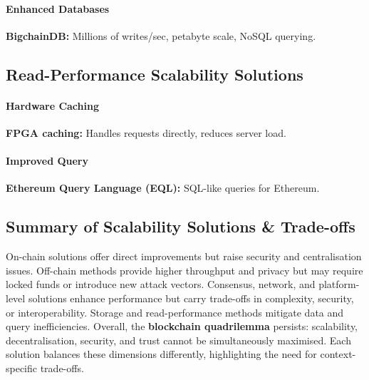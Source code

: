 \paragraph{Enhanced Databases}
\textbf{BigchainDB:} Millions of writes/sec, petabyte scale, NoSQL querying.

\subsection{Read-Performance Scalability Solutions}
\paragraph{Hardware Caching}
\textbf{FPGA caching:} Handles requests directly, reduces server load.

\paragraph{Improved Query}
\textbf{Ethereum Query Language (EQL):} SQL-like queries for Ethereum.

\subsection{Summary of Scalability Solutions \& Trade-offs}
On-chain solutions offer direct improvements but raise security and centralisation issues. Off-chain methods provide higher throughput and privacy but may require locked funds or introduce new attack vectors. Consensus, network, and platform-level solutions enhance performance but carry trade-offs in complexity, security, or interoperability. Storage and read-performance methods mitigate data and query inefficiencies.  
Overall, the \textbf{blockchain quadrilemma} persists: scalability, decentralisation, security, and trust cannot be simultaneously maximised. Each solution balances these dimensions differently, highlighting the need for context-specific trade-offs.
